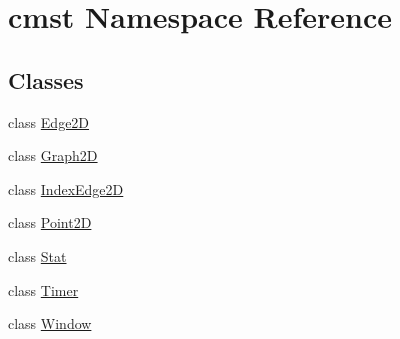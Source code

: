 \hypertarget{namespacecmst}{}\section{cmst Namespace Reference}
\label{namespacecmst}
\subsection*{Classes}
\begin{DoxyCompactItemize}
\item 
class \hyperlink{classcmst_1_1_edge2_d}{Edge2D}
\item 
class \hyperlink{classcmst_1_1_graph2_d}{Graph2D}
\item 
class \hyperlink{classcmst_1_1_index_edge2_d}{IndexEdge2D}
\item 
class \hyperlink{classcmst_1_1_point2_d}{Point2D}
\item 
class \hyperlink{classcmst_1_1_stat}{Stat}
\item 
class \hyperlink{classcmst_1_1_timer}{Timer}
\item 
class \hyperlink{classcmst_1_1_window}{Window}
\end{DoxyCompactItemize}
